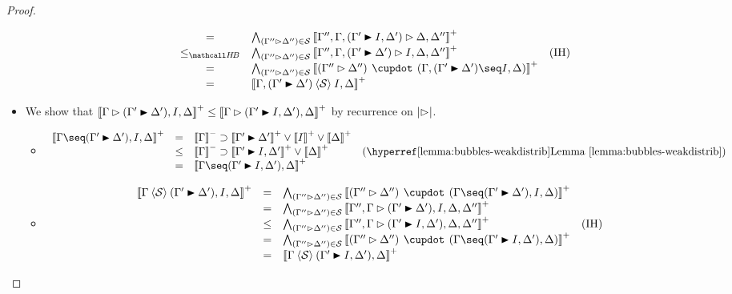 \begin{proof}
\begin{itemize}
\begin{itemize}
$$\begin{array}{rcll}
        &=& \psintAnd{(\Gamma'' \J \Delta'')}{\cS}{\Gamma'', \Gamma, (\Gamma' \JB I, \Delta') \J \Delta, \Delta''} & \\
        &\sementHB& \psintAnd{(\Gamma'' \J \Delta'')}{\cS}{\Gamma'', \Gamma, (\Gamma' \JB \Delta') \J I, \Delta, \Delta''} &\text{(IH)} \\
        &=& \psintAndMix{(\Gamma'' \J \Delta'')}{\cS}{\Gamma, (\Gamma' \JB \Delta')}{I, \Delta} & \\
        &=& \psint{\Gamma, (\Gamma' \JB \Delta') \piq{\cS} I, \Delta} & \\
      \end{array}
      $$
    \end{itemize}
    \item[{\rsf{f{+}{+}{\ua}}}]
    We show that $\psint{\Gamma \J (\Gamma' \JB \Delta'), I, \Delta} \sement
    \psint{\Gamma \J (\Gamma' \JB I, \Delta'), \Delta}$ by recurrence on
    $\bradepth{\J}$.
    \begin{itemize}
      \item[\bcase]
      $$
      \begin{array}{rcll}
        \psint{\Gamma \seq (\Gamma' \JB \Delta'), I, \Delta}
        &=& \nsint{\Gamma} \limp \psint{\Gamma' \JB \Delta'} \lor \psint{I} \lor \psint{\Delta} & \\
        &\sement& \nsint{\Gamma} \limp \psint{\Gamma' \JB I, \Delta'} \lor \psint{\Delta} &\text{(\reflemma{bubbles-weakdistrib})} \\
        &=& \psint{\Gamma \seq (\Gamma' \JB I, \Delta'), \Delta} & \\
      \end{array}
      $$
      \item[\rcase]
      $$
      \begin{array}{rcll}
        \psint{\Gamma \piq{\cS} (\Gamma' \JB \Delta'), I, \Delta}
        &=& \psintAndMix{(\Gamma'' \J \Delta'')}{\cS}{\Gamma}{(\Gamma' \JB \Delta'), I, \Delta} & \\
        &=& \psintAnd{(\Gamma'' \J \Delta'')}{\cS}{\Gamma'', \Gamma \J (\Gamma' \JB \Delta'), I, \Delta, \Delta''} & \\
        &\sement& \psintAnd{(\Gamma'' \J \Delta'')}{\cS}{\Gamma'', \Gamma \J (\Gamma' \JB I, \Delta'), \Delta, \Delta''} &\text{(IH)} \\
        &=& \psintAndMix{(\Gamma'' \J \Delta'')}{\cS}{\Gamma}{(\Gamma' \JB I, \Delta'), \Delta} & \\
        &=& \psint{\Gamma \piq{\cS} (\Gamma' \JB I, \Delta'), \Delta} & \\

\end{array}$$
\end{itemize}
\end{itemize}
\end{proof}
